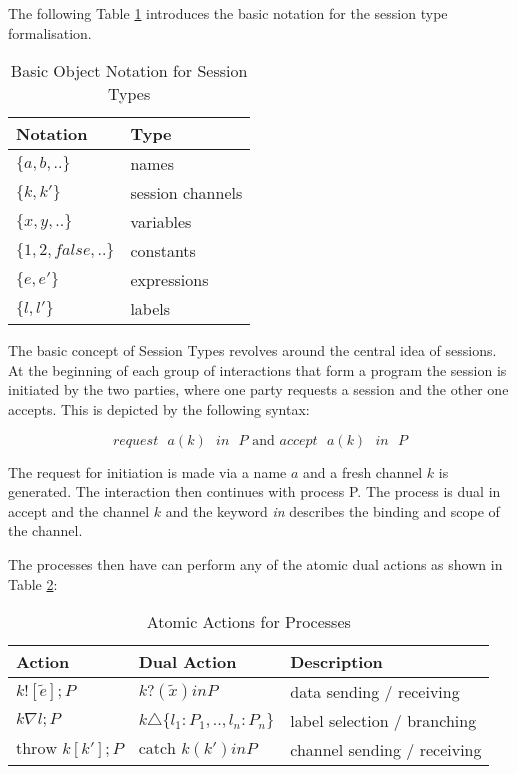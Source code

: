 The following Table \ref{TBobject_notation} introduces the basic notation for the session type formalisation.

\begin{table}[H]
\center
\caption{Basic Object Notation for Session Types}
\begin{tabular}{|l|l|}
  \hline
  Notation & Type \\
  \hline
  $\{a,b,..\}$ & names \\
  $\{k,k'\}$ & session channels \\
  $\{x,y,..\}$ & variables \\
  $\{1,2,false,..\}$ & constants \\
  $\{e,e'\}$ & expressions \\
  $\{l,l'\}$ & labels \\
  \hline
\end{tabular}
\label{TBobject_notation}
\end{table}

The basic concept of Session Types revolves around the central idea of sessions. At the beginning of each group of interactions that form a program the session is initiated by the two parties, where one party requests a session and the other one accepts. This is depicted by the following syntax:

\[request\mbox{ }a(k)\mbox{ }in\mbox{ }P\mbox{ and }accept\mbox{ }a(k)\mbox{ }in\mbox{ }P\]

The request for initiation is made via a name $a$ and a fresh channel $k$ is generated. The interaction then continues with process P. The process is dual in accept and the channel $k$ and the keyword \textit{in} describes the binding and scope of the channel.

The processes then have can perform any of the atomic dual actions as shown in Table \ref{TBatomic_actions}:

\begin{table}[H]
\center
\caption{Atomic Actions for Processes}
\begin{tabular}{|l|l|l|}
  \hline
   Action & Dual Action & Description \\
   \hline
  $k![\tilde{e}];P$ & $k?(\tilde{x}) in P$ & data sending / receiving \\
  $k\nabla l;P$ & $k\triangle \{l_1:P_1,..,l_n:P_n\}$ & label selection / branching \\
  $\mbox{throw } k[k'];P$ & $\mbox{catch } k(k') in P$ & channel sending / receiving \\
  \hline
\end{tabular}
\label{TBatomic_actions}
\end{table}

